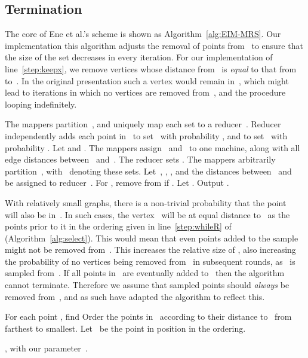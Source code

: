 \documentclass[11pt]{article}
\begin{document}
\subsection{Termination}
The core of Ene et al.'s scheme is shown as Algorithm~\ref{alg:EIM-MRS}.
Our implementation this algorithm adjusts the removal of points from~
to ensure that the size of the set decreases in every iteration.
For our implementation of line~\ref{step:keepx},
we remove vertices whose distance from~ is \emph{equal} to that
from~ to~. 
In the original presentation such a vertex would remain in~,
which might lead to iterations in which
no vertices are removed from~, and the procedure looping indefinitely. 

{
\begin{algorithm}\begin{algorithmic}[1]
\small
\STATE 
\WHILE{}
		\STATE The mappers partition~, and uniquely map each set  to a reducer~.
		\STATE Reducer~ independently adds each point in~ to set~  with probability , and to set~  with probability .
		\STATE Let  and . The mappers
assign~ and~ to one machine, along with all edge distances between~ and~.
		\STATE The reducer sets .
		\STATE The mappers arbitrarily partition~, with~ denoting  these sets. Let~, , , and the distances between~ and~ be assigned to reducer~. 
		\STATE For , remove  from  if .\label{step:keepx}	 	
		\STATE Let .
\ENDWHILE
\STATE Output .
\end{algorithmic}
\caption{}
\label{alg:EIM-MRS}
\end{algorithm}
}



With relatively small graphs, there is
a non-trivial probability that the point~ will also be in~.
In such cases, the vertex~ will be at equal distance to~ as the
points prior to it in the ordering given in line~\ref{step:whileR}
of  (Algorithm~\ref{alg:select}).
This would mean that even points added to the sample might not be removed from~.  
This increases the relative size of , also increasing
the probability of no vertices being removed from~ in subsequent rounds,
as~ is sampled from~.
If all points in~ are eventually added to~ then the algorithm cannot
terminate.
Therefore we assume that sampled points should \emph{always} be removed
from~, and as such have adapted the algorithm to reflect this.

\begin{algorithm}[H]
\begin{algorithmic}[1]
\small
\STATE For each point , find 
\STATE \label{step:whileR} Order the points in~ according to their distance to~ from farthest to smallest.
\STATE Let~ be the point in position   in the ordering.
\RETURN 
\end{algorithmic}
\caption{, with our parameter~.}
\label{alg:select}
\end{algorithm}
\end{document}
